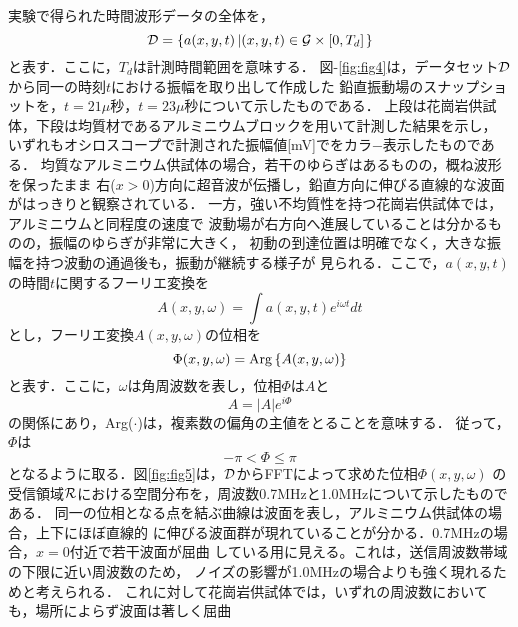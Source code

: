 ﻿%
実験で得られた時間波形データの全体を，
\begin{equation}
	{\cal D}=\left\{
		a(x,y,t)\left| (x,y,t)\in {\cal G}\times [0,T_d] \right.
	\right\}
	\label{eqn:dataset}
\end{equation}
と表す．ここに，$T_d$は計測時間範囲を意味する．
図-\ref{fig:fig4}は，データセット$\cal D$から同一の時刻$t$における振幅を取り出して作成した
鉛直振動場のスナップショットを，$t=21\mu$秒，$t=23\mu$秒について示したものである．
上段は花崗岩供試体，下段は均質材であるアルミニウムブロックを用いて計測した結果を示し，
いずれもオシロスコープで計測された振幅値[mV]でをカラ−表示したものである．
均質なアルミニウム供試体の場合，若干のゆらぎはあるものの，概ね波形を保ったまま
右($x>0$)方向に超音波が伝播し，鉛直方向に伸びる直線的な波面がはっきりと観察されている．
一方，強い不均質性を持つ花崗岩供試体では，アルミニウムと同程度の速度で
波動場が右方向へ進展していることは分かるものの，振幅のゆらぎが非常に大きく，
初動の到達位置は明確でなく，大きな振幅を持つ波動の通過後も，振動が継続する様子が
見られる．ここで，$a(x,y,t)$の時間$t$に関するフーリエ変換を
\begin{equation}
	A(x,y,\omega)=\int a(x,y,t)e^{i\omega t} dt
	\label{eqn:Fourier_t}
\end{equation}
とし，フーリエ変換$A(x,y,\omega)$の位相を
\begin{equation}
	\Phi(x,y,\omega)={\rm Arg}\left\{ A(x,y,\omega) \right\}
	\label{eqn:def_Phi}
\end{equation}
と表す．ここに，$\omega$は角周波数を表し，位相$\Phi$は$A$と
\begin{equation}
	A=\left| A \right|e^{i\Phi}
	\label{eqn:phi2A}
\end{equation}
の関係にあり，Arg($\cdot$)は，複素数の偏角の主値をとることを意味する．
従って，$\Phi$は
\begin{equation}
	-\pi < \Phi \leq \pi
	\label{eqn:dom_phi}
\end{equation}
となるように取る．図\ref{fig:fig5}は，$\cal D$からFFTによって求めた位相$\Phi(x,y,\omega)$
の受信領域$\cal R$における空間分布を，周波数0.7MHzと1.0MHzについて示したものである．
同一の位相となる点を結ぶ曲線は波面を表し，アルミニウム供試体の場合，上下にほぼ直線的
に伸びる波面群が現れていることが分かる．0.7MHzの場合，$x=0$付近で若干波面が屈曲
している用に見える。これは，送信周波数帯域の下限に近い周波数のため，
ノイズの影響が1.0MHzの場合よりも強く現れるためと考えられる．
これに対して花崗岩供試体では，いずれの周波数においても，場所によらず波面は著しく屈曲

